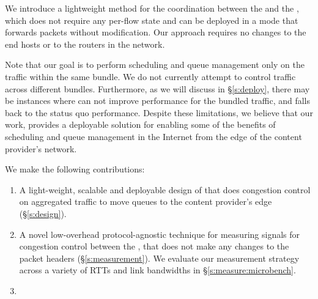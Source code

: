 We introduce a lightweight method for the coordination between the \inbox and the \outbox, which does not require any per-flow state and can be deployed in a mode that forwards packets without modification. Our approach requires no changes to the end hosts or to the routers in the network.
 
Note that our goal is to perform scheduling and queue management only on the traffic within the same bundle. We do not currently attempt to control traffic across different bundles. 
Furthermore, as we will discuss in \S\ref{s:deploy}, there may be instances where \name can not improve performance for the bundled traffic, and falls back to the status quo performance. 
Despite these limitations, we believe that our work, provides a deployable solution for enabling some of the benefits of scheduling and queue management in the Internet from the edge of the content provider's network.
 
We make the following contributions:
\begin{enumerate}
     \item A light-weight, scalable and deployable design of \name that does congestion control on aggregated traffic to move queues to the content provider's edge (\S\ref{s:design}).
     \item A novel low-overhead protocol-agnostic technique for measuring signals for congestion control between the \pair, that does not make any changes to the packet headers (\S\ref{s:measurement}). We evaluate our measurement strategy across a variety of RTTs and link bandwidths in \S\ref{s:measure:microbench}. 
     \item {}
\end{enumerate}
